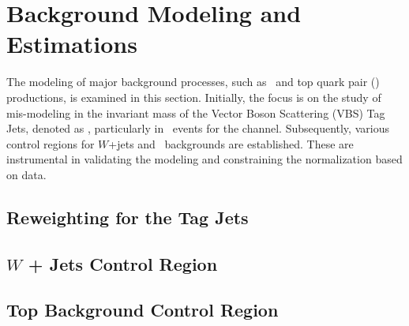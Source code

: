 \chapter{Background Modeling and Estimations}

The modeling of major background processes, such as \Wjets\ and top quark pair (\ttbar) productions, is examined in this section.
Initially, the focus is on the study of mis-modeling in the invariant mass of the Vector Boson Scattering (VBS) Tag Jets, denoted as \mjjtag, particularly in \Wjets\ events for the \olep channel. Subsequently, various control regions for $W$+jets and \ttbar\ backgrounds are established. These are instrumental in validating the modeling and constraining the normalization based on data.



\section{Reweighting for the Tag Jets}

\clearpage
\section{\( W \) + Jets Control Region}

\clearpage
\section{Top Background Control Region}

